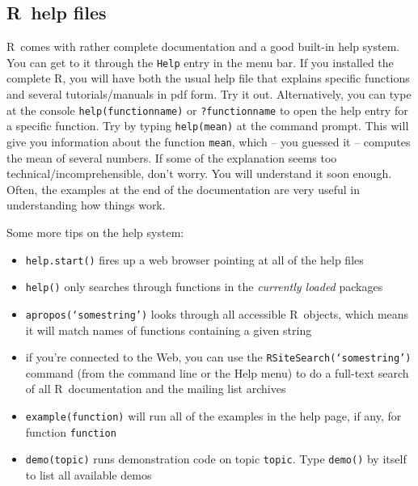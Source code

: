 \documentclass [11pt]{article}
\newcommand{\code}[1]{{\tt #1}}
\newcommand\R{{\sf R}}
\numberwithin{exercise}{section}
\begin{document}
\subsection{\R\ help files}
\R\ comes with rather complete documentation and a good built-in help system. You can get to it through the \code{Help} entry in the menu bar. If you installed the complete \R, you will have both the usual help file that explains specific functions and several tutorials/manuals in pdf form. Try it out. 
Alternatively, you can type at the console \code{help(functionname)} or \code{?functionname} to open the help entry for a specific function. Try by typing \code{help(mean)} at the command prompt. This will give you information about the function \code{mean}, which -- you guessed it -- computes the mean of several numbers. If some of the explanation seems too technical/incomprehensible, don't worry. You will understand it soon enough. Often, the examples at the end of the documentation are very useful in understanding how things work.

Some more tips on the help system:
\begin{itemize}
\item{\code{help.start()} fires up a web browser pointing at all of the
help files}
\item{\code{help()} only searches through functions in
the \emph{currently loaded} packages}
\item{\code{apropos(`somestring')} looks through all accessible \R\ objects, which means it will match names of functions containing a given string}
\item{if you're connected to the Web, you can use the \code{RSiteSearch(`somestring')} command (from the command line or the Help menu) to do a full-text
search of all \R\ documentation and the mailing list archives}
\item{\code{example(function)} will run all of the examples in the
help page, if any, for function \code{function}}
\item{\code{demo(topic)} runs demonstration code on topic \code{topic}. Type
\code{demo()} by itself to list all available demos}
\end{itemize}

\end{document}
